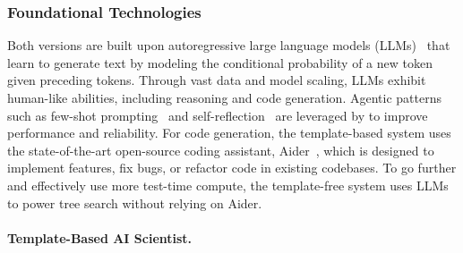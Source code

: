 \subsubsection*{Foundational Technologies}
Both versions are built upon autoregressive large language models (LLMs)~\citep{gpt4, claude3, llama3} that learn to generate text by modeling the conditional probability of a new token given preceding tokens. Through vast data and model scaling, LLMs exhibit human-like abilities, including reasoning and code generation. Agentic patterns~\citep{llm_agent_survey} such as few-shot prompting~\citep{brown2020language}
and self-reflection~\citep{shinn2024reflexion} are leveraged by \ouralgo to improve performance and reliability.
For code generation, the template-based system uses the state-of-the-art open-source coding assistant, Aider~\citep{aider}, which is designed to implement features, fix bugs, or refactor code in existing codebases.
To go further and effectively use more test-time compute, the template-free system uses LLMs to power tree search without relying on Aider.

\paragraph{Template-Based AI Scientist.}
\label{subsec:template-method}

